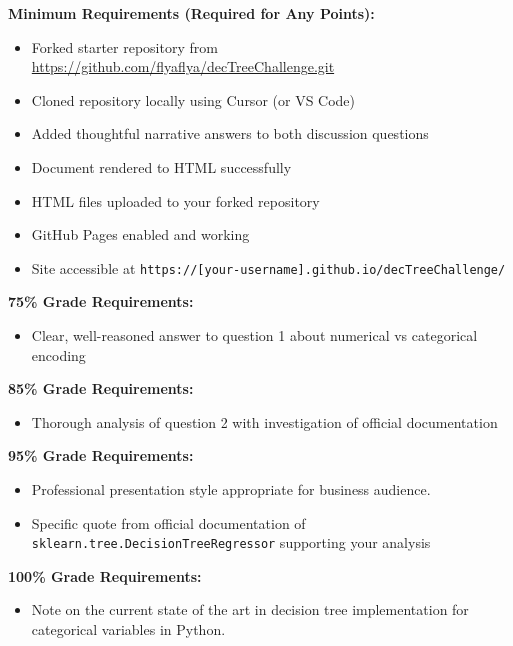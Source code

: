 \documentclass[
  letterpaper,
  DIV=11,
  numbers=noendperiod]{scrartcl}
\providecommand{\tightlist}{%
  \setlength{\itemsep}{0pt}\setlength{\parskip}{0pt}}
\begin{document}
\textbf{Minimum Requirements (Required for Any Points):}

\begin{itemize}
\tightlist
\item[$\square$]
  Forked starter repository from
  \url{https://github.com/flyaflya/decTreeChallenge.git}
\item[$\square$]
  Cloned repository locally using Cursor (or VS Code)
\item[$\square$]
  Added thoughtful narrative answers to both discussion questions
\item[$\square$]
  Document rendered to HTML successfully
\item[$\square$]
  HTML files uploaded to your forked repository
\item[$\square$]
  GitHub Pages enabled and working
\item[$\square$]
  Site accessible at
  \texttt{https://{[}your-username{]}.github.io/decTreeChallenge/}
\end{itemize}

\textbf{75\% Grade Requirements:}

\begin{itemize}
\tightlist
\item[$\square$]
  Clear, well-reasoned answer to question 1 about numerical vs
  categorical encoding
\end{itemize}

\textbf{85\% Grade Requirements:}

\begin{itemize}
\tightlist
\item[$\square$]
  Thorough analysis of question 2 with investigation of official
  documentation
\end{itemize}

\textbf{95\% Grade Requirements:}

\begin{itemize}
\tightlist
\item[$\square$]
  Professional presentation style appropriate for business audience.
\item[$\square$]
  Specific quote from official documentation of
  \texttt{sklearn.tree.DecisionTreeRegressor} supporting your analysis
\end{itemize}

\textbf{100\% Grade Requirements:}

\begin{itemize}
\tightlist
\item[$\square$]
  Note on the current state of the art in decision tree implementation
  for categorical variables in Python.
\end{itemize}
\end{document}
